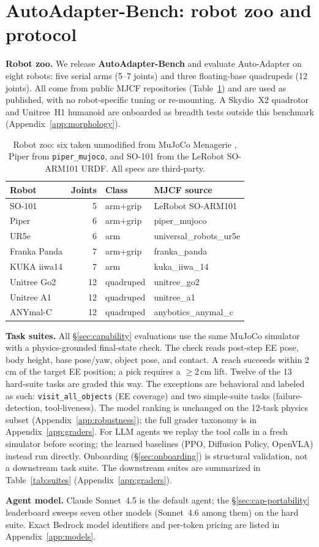 \section{AutoAdapter-Bench: robot zoo and protocol}
\label{sec:protocol}

\noindent\textbf{Robot zoo.} We release \textbf{AutoAdapter-Bench}
and evaluate Auto-Adapter on eight robots: five serial arms
(5--7 joints) and three floating-base quadrupeds (12 joints). All
come from public MJCF repositories (Table~\ref{tab:zoo}) and are
used as published, with no robot-specific tuning or re-mounting.
A Skydio~X2 quadrotor and Unitree~H1 humanoid are onboarded as
breadth tests outside this benchmark (Appendix~\ref{app:morphology}).

\begin{table}[t]
\centering
\small
\setlength{\tabcolsep}{3pt}
\begin{tabular}{lrll}
\toprule
\textbf{Robot} & \textbf{Joints} & \textbf{Class} & \textbf{MJCF source} \\
\midrule
SO-101       &  5 & arm+grip    & LeRobot SO-ARM101 \\
Piper        &  6 & arm+grip    & piper\_mujoco \\
UR5e         &  6 & arm         & universal\_robots\_ur5e \\
Franka Panda &  7 & arm+grip    & franka\_panda \\
KUKA iiwa14  &  7 & arm         & kuka\_iiwa\_14 \\
Unitree Go2  & 12 & quadruped   & unitree\_go2 \\
Unitree A1   & 12 & quadruped   & unitree\_a1 \\
ANYmal-C     & 12 & quadruped   & anybotics\_anymal\_c \\
\bottomrule
\end{tabular}
\caption{Robot zoo: six taken unmodified from MuJoCo Menagerie
\citep{menagerie2022}, Piper from \texttt{piper\_mujoco}, and SO-101 from
the LeRobot SO-ARM101 URDF. All specs are third-party.}
\label{tab:zoo}
\end{table}

\noindent\textbf{Task suites.} All \S\ref{sec:capability}
evaluations use the same MuJoCo simulator with a physics-grounded
final-state check. The check reads post-step EE pose, body height,
base pose/yaw, object pose, and contact. A reach succeeds within
2\,cm of the target EE position; a pick requires a $\geq$2\,cm lift.
Twelve of the 13 hard-suite tasks are graded this way. The exceptions
are behavioral and labeled as such: \texttt{visit\_all\_objects} (EE
coverage) and two simple-suite tasks (failure-detection, tool-liveness). The model ranking is
unchanged on the 12-task physics subset (Appendix~\ref{app:robustness});
the full grader taxonomy is in Appendix~\ref{app:graders}. For LLM
agents we replay the tool calls in a fresh simulator before
scoring; the learned baselines (PPO, Diffusion Policy, OpenVLA)
instead run directly. Onboarding
(\S\ref{sec:onboarding}) is structural validation, not a downstream
task suite. The downstream suites are summarized in
Table~\ref{tab:suites} (Appendix~\ref{app:graders}).

\noindent\textbf{Agent model.} Claude Sonnet~4.5 is the default
agent; the \S\ref{sec:cap-portability} leaderboard sweeps
seven other models (Sonnet~4.6 among them) on
the hard suite. Exact Bedrock model identifiers
and per-token pricing are listed in Appendix~\ref{app:models}.
